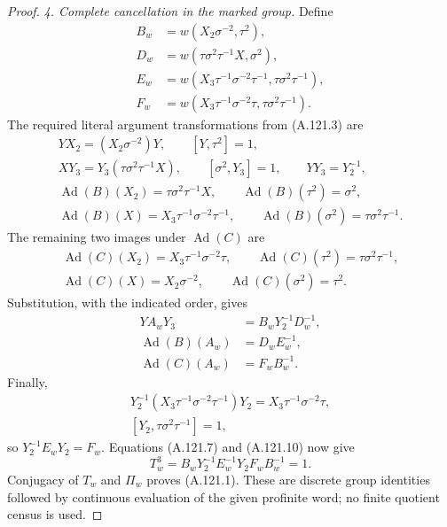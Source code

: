 \begin{proof}
\emph{4. Complete cancellation in the marked group.}
Define
\[
 \begin{aligned}
 B_w&=w(X_2\sigma^{-2},\tau^2),\\
 D_w&=w(\tau\sigma^2\tau^{-1}X,\sigma^2),\\
 E_w&=w(X_3\tau^{-1}\sigma^{-2}\tau^{-1},
                                     \tau\sigma^2\tau^{-1}),\\
 F_w&=w(X_3\tau^{-1}\sigma^{-2}\tau,
                                     \tau\sigma^2\tau^{-1}).
 \end{aligned}                                                \tag{A.121.8}
\]
The required literal argument transformations from (A.121.3) are
\[
 \begin{gathered}
 YX_2=(X_2\sigma^{-2})Y,\qquad [Y,\tau^2]=1,\\
 XY_3=Y_3(\tau\sigma^2\tau^{-1}X),\qquad
 [\sigma^2,Y_3]=1,\qquad YY_3=Y_2^{-1},\\
 \operatorname{Ad}(B)(X_2)=\tau\sigma^2\tau^{-1}X,\qquad
 \operatorname{Ad}(B)(\tau^2)=\sigma^2,\\
 \operatorname{Ad}(B)(X)=X_3\tau^{-1}\sigma^{-2}\tau^{-1},\qquad
 \operatorname{Ad}(B)(\sigma^2)=\tau\sigma^2\tau^{-1}.
 \end{gathered}                                                \tag{A.121.9}
\]
The remaining two images under \(\operatorname{Ad}(C)\) are
\[
 \begin{gathered}
 \operatorname{Ad}(C)(X_2)=X_3\tau^{-1}\sigma^{-2}\tau,\qquad
 \operatorname{Ad}(C)(\tau^2)=\tau\sigma^2\tau^{-1},\\
 \operatorname{Ad}(C)(X)=X_2\sigma^{-2},\qquad
 \operatorname{Ad}(C)(\sigma^2)=\tau^2 .
 \end{gathered}
\]
Substitution, with the indicated order, gives
\[
 \begin{aligned}
 YA_wY_3&=B_wY_2^{-1}D_w^{-1},\\
 \operatorname{Ad}(B)(A_w)&=D_wE_w^{-1},\\
 \operatorname{Ad}(C)(A_w)&=F_wB_w^{-1}.
 \end{aligned}                                                \tag{A.121.10}
\]
Finally,
\[
 \begin{gathered}
 Y_2^{-1}(X_3\tau^{-1}\sigma^{-2}\tau^{-1})Y_2
              =X_3\tau^{-1}\sigma^{-2}\tau,\\
 [Y_2,\tau\sigma^2\tau^{-1}]=1,
 \end{gathered}
\]
so \(Y_2^{-1}E_wY_2=F_w\). Equations (A.121.7) and
(A.121.10) now give
\[
 T_w^3=B_wY_2^{-1}E_w^{-1}Y_2F_wB_w^{-1}=1 .
\]
Conjugacy of \(T_w\) and \(\Pi_w\) proves (A.121.1).
These are discrete group identities followed by continuous evaluation
of the given profinite word; no finite quotient census is used.


\end{proof}
